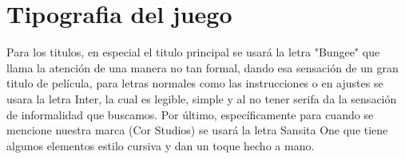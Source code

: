 \documentclass[12pt, oneside, letterpaper]{book}
\begin{document}
\section{Tipografia del juego}
\par Para los titulos, en especial el titulo principal se usará la letra "Bungee" que llama la atención de una manera no tan formal, dando esa sensación de un gran titulo de película, para letras normales como las instrucciones o en ajustes se usara la letra Inter, la cual es legible, simple y al no tener serifa da la sensación de informalidad que buscamos. Por último, específicamente para cuando se mencione nuestra marca (Cor Studios) se usará la letra Sansita One que tiene algunos elementos estilo cursiva y dan un toque hecho a mano. 
\bigskip

















\end{document}
